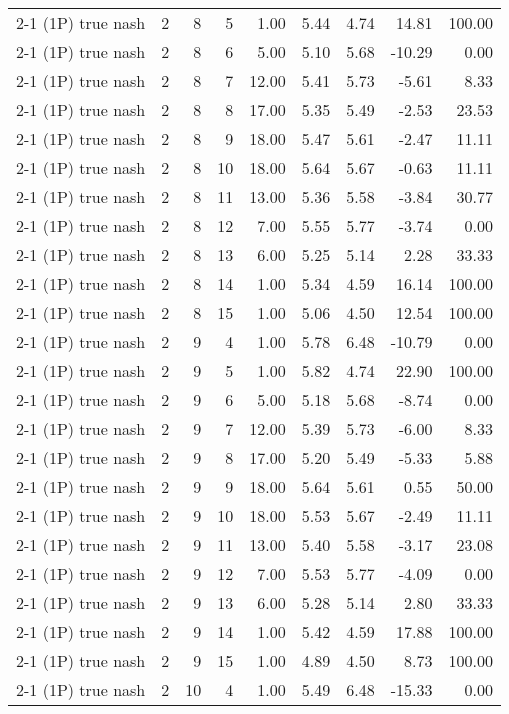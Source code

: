 \begin{tabular}{lrrrrrrrr}
2-1 (1P) true nash & 2 & 8 & 5 & 1.00 & 5.44 & 4.74 & 14.81 & 100.00 \\
2-1 (1P) true nash & 2 & 8 & 6 & 5.00 & 5.10 & 5.68 & -10.29 & 0.00 \\
2-1 (1P) true nash & 2 & 8 & 7 & 12.00 & 5.41 & 5.73 & -5.61 & 8.33 \\
2-1 (1P) true nash & 2 & 8 & 8 & 17.00 & 5.35 & 5.49 & -2.53 & 23.53 \\
2-1 (1P) true nash & 2 & 8 & 9 & 18.00 & 5.47 & 5.61 & -2.47 & 11.11 \\
2-1 (1P) true nash & 2 & 8 & 10 & 18.00 & 5.64 & 5.67 & -0.63 & 11.11 \\
2-1 (1P) true nash & 2 & 8 & 11 & 13.00 & 5.36 & 5.58 & -3.84 & 30.77 \\
2-1 (1P) true nash & 2 & 8 & 12 & 7.00 & 5.55 & 5.77 & -3.74 & 0.00 \\
2-1 (1P) true nash & 2 & 8 & 13 & 6.00 & 5.25 & 5.14 & 2.28 & 33.33 \\
2-1 (1P) true nash & 2 & 8 & 14 & 1.00 & 5.34 & 4.59 & 16.14 & 100.00 \\
2-1 (1P) true nash & 2 & 8 & 15 & 1.00 & 5.06 & 4.50 & 12.54 & 100.00 \\
2-1 (1P) true nash & 2 & 9 & 4 & 1.00 & 5.78 & 6.48 & -10.79 & 0.00 \\
2-1 (1P) true nash & 2 & 9 & 5 & 1.00 & 5.82 & 4.74 & 22.90 & 100.00 \\
2-1 (1P) true nash & 2 & 9 & 6 & 5.00 & 5.18 & 5.68 & -8.74 & 0.00 \\
2-1 (1P) true nash & 2 & 9 & 7 & 12.00 & 5.39 & 5.73 & -6.00 & 8.33 \\
2-1 (1P) true nash & 2 & 9 & 8 & 17.00 & 5.20 & 5.49 & -5.33 & 5.88 \\
2-1 (1P) true nash & 2 & 9 & 9 & 18.00 & 5.64 & 5.61 & 0.55 & 50.00 \\
2-1 (1P) true nash & 2 & 9 & 10 & 18.00 & 5.53 & 5.67 & -2.49 & 11.11 \\
2-1 (1P) true nash & 2 & 9 & 11 & 13.00 & 5.40 & 5.58 & -3.17 & 23.08 \\
2-1 (1P) true nash & 2 & 9 & 12 & 7.00 & 5.53 & 5.77 & -4.09 & 0.00 \\
2-1 (1P) true nash & 2 & 9 & 13 & 6.00 & 5.28 & 5.14 & 2.80 & 33.33 \\
2-1 (1P) true nash & 2 & 9 & 14 & 1.00 & 5.42 & 4.59 & 17.88 & 100.00 \\
2-1 (1P) true nash & 2 & 9 & 15 & 1.00 & 4.89 & 4.50 & 8.73 & 100.00 \\
2-1 (1P) true nash & 2 & 10 & 4 & 1.00 & 5.49 & 6.48 & -15.33 & 0.00 \\

\end{tabular}
